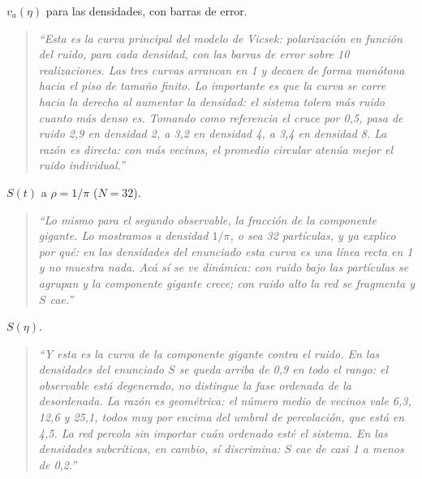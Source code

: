 \documentclass[11pt]{article}
\begin{document}
$v_a(\eta)$ para las densidades, con barras de error.

\begin{quote}
\itshape
``Esta es la curva principal del modelo de Vicsek: polarización en función del
ruido, para cada densidad, con las barras de error sobre 10 realizaciones. Las
tres curvas arrancan en 1 y decaen de forma monótona hacia el piso de tamaño
finito. Lo importante es que \emph{la curva se corre hacia la derecha al
aumentar la densidad}: el sistema tolera más ruido cuanto más denso es. Tomando
como referencia el cruce por 0,5, pasa de ruido 2,9 en densidad 2, a 3,2 en
densidad 4, a 3,4 en densidad 8. La razón es directa: con más vecinos, el
promedio circular atenúa mejor el ruido individual.''
\end{quote}



$S(t)$ a $\rho = 1/\pi$ ($N = 32$).

\begin{quote}
\itshape
``Lo mismo para el segundo observable, la fracción de la componente gigante. Lo
mostramos a densidad $1/\pi$, o sea 32 partículas, y ya explico por qué: en las
densidades del enunciado esta curva es una línea recta en 1 y no muestra nada.
Acá sí se ve dinámica: con ruido bajo las partículas se agrupan y la componente
gigante crece; con ruido alto la red se fragmenta y $S$ cae.''
\end{quote}



$S(\eta)$.

\begin{quote}
\itshape
``Y esta es la curva de la componente gigante contra el ruido. En las
densidades del enunciado $S$ se queda arriba de 0,9 en todo el rango: el
observable está degenerado, no distingue la fase ordenada de la desordenada. La
razón es geométrica: el número medio de vecinos vale 6,3, 12,6 y 25,1, todos muy
por encima del umbral de percolación, que está en 4,5. La red percola sin
importar cuán ordenado esté el sistema. En las densidades subcríticas, en
cambio, sí discrimina: $S$ cae de casi 1 a menos de 0,2.''
\end{quote}
\end{document}
